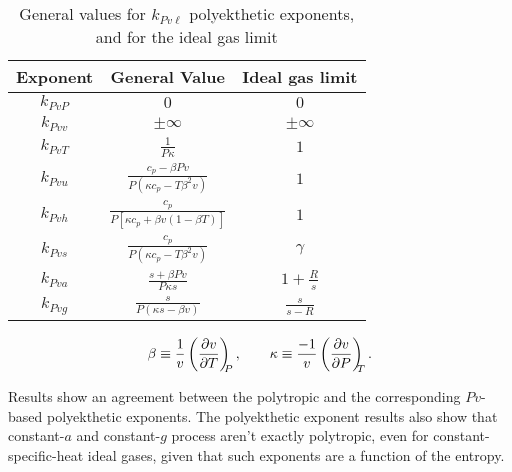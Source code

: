     \begin{table}[ht]
        \centering
        \caption{General values for $k_{Pv\ell}$ polyekthetic exponents, and for the  ideal  gas
            limit}
        \vspace{4pt}
        \begin{tabular}{ccc}
            \toprule
            Exponent    & General Value &
            Ideal gas limit \\
            \midrule
            $k_{PvP}$   &
            $0$ &
            $0$ \\[\bigskipamount]
            $k_{Pvv}$   &
            $\pm\infty$ &
            $\pm\infty$ \\[\bigskipamount]
            $k_{PvT}$   &
            \(\displaystyle\frac{1}{P\kappa}\) &
            $1$ \\[\bigskipamount]
            $k_{Pvu}$   &
            \(\displaystyle\frac{c_p - \beta Pv}{P(\kappa c_p - T\beta^2v)}\) &
            $1$ \\[\bigskipamount]
            $k_{Pvh}$   &
            \(\displaystyle\frac{c_p}{P[\kappa c_p + \beta v(1 - \beta T)]}\) &
            $1$ \\[\bigskipamount]
            $k_{Pvs}$   &
            \(\displaystyle\frac{c_p}{P(\kappa c_p - T\beta^2v)}\) &
            $\gamma$ \\[\bigskipamount]
            $k_{Pva}$   &
            \(\displaystyle\frac{s + \beta Pv}{P\kappa s}\) &
            \(\displaystyle 1 + \frac{R}{s}\) \\[\bigskipamount]
            $k_{Pvg}$   &
            \(\displaystyle\frac{s}{P(\kappa s - \beta v)}\) &
            \(\displaystyle\frac{s}{s - R}\) \\[\bigskipamount]
            \bottomrule
        \end{tabular}
        \label{tab:kPv}
    \end{table}

    \begin{equation}
        \beta \equiv \frac{1}{v}\left(\frac{\partial {{v}}}{\partial {{T}}}\right)_{\!\!\!{P}}, \qquad
        \kappa \equiv \frac{-1}{v} \left(\frac{\partial {{v}}}{\partial {{P}}}\right)_{\!\!\!{T}}.
        \label{eq:auxs}
    \end{equation}

    Results  show  an  agreement  between  the  polytropic  and  the  corresponding   $Pv$-based
    polyekthetic exponents. The polyekthetic exponent results also show  that  constant-$a$  and
    constant-$g$ process aren't exactly polytropic, even for constant-specific-heat ideal gases,
    given that such exponents are a function of the entropy.

